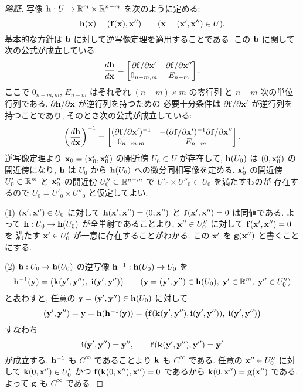 \documentclass[12pt,twoside]{jarticle}
\begin{document}
\begin{proof}[略証]
 写像 $\h:U\to \R^m\times\R^{n-m}$ を次のように定める:
 \begin{equation*}
  \h(\x) = (\f(\x),\x'')
  \qquad (\x=(\x',\x'')\in U).
 \end{equation*} 
 基本的な方針は $\h$ に対して逆写像定理を適用することである.
 この $\h$ に関して次の公式が成立している:
 \begin{equation*}
  \dfrac{d\h}{d\x} = 
  \begin{bmatrix}
   \d\f/\d\x' & \d\f/\d\x'' \\
   0_{n-m,m}  & E_{n-m} \\
  \end{bmatrix}.
 \end{equation*}
 ここで $0_{n-m,m}$, $E_{n-m}$ はそれぞれ $(n-m)\times m$ の零行列
 と $n-m$ 次の単位行列である. $\d\h/\d\x$ が逆行列を持つための
 必要十分条件は $\d\f/\d\x'$ が逆行列を持つことであり, 
 そのとき次の公式が成立している:
 \begin{equation*}
  \left(\dfrac{d\h}{d\x}\right)^{-1} = 
  \begin{bmatrix}
   (\d\f/\d\x')^{-1} & -(\d\f/\d\x')^{-1}\d\f/\d\x'' \\
   0_{n-m,m}         & E_{n-m} \\
  \end{bmatrix}.
 \end{equation*}
 逆写像定理より $\x_0=(\x'_0,\x''_0)$ の開近傍 $U_0\subset U$ が存在して, 
 $\h(U_0)$ は $(0,\x_0'')$ の開近傍になり, 
 $\h$ は $U_0$ から $\h(U_0)$ への微分同相写像を定める.
 $\x'_0$ の開近傍 $U'_0\subset\R^m$ 
 と $\x''_0$ の開近傍 $U''_0\subset\R^{n-m}$ で
 $U'_0\times U''_0\subset U_0$ を満たすものが
 存在するので $U_0=U'_0\times U''_0$ と仮定してよい.

 (1) $(\x',\x'')\in U_0$ に対して $\h(\x',\x'')=(0,\x'')$ と 
 $\f(\x',\x'')=0$ は同値である. 
 よって $\h:U_0\to\h(U_0)$ が全単射であることより, 
 $\x''\in U''_0$ に対して $\f(\x',\x'')=0$ を
 満たす $\x'\in U'_0$ が一意に存在することがわかる.
 この $\x'$ を $\g(\x'')$ と書くことにする.

 (2) $\h:U_0\to\h(U_0)$ の逆写像 $\h^{-1}:\h(U_0)\to U_0$ を
 \begin{equation*}
  \h^{-1}(\y)=\bigl(\k(\y',\y''),\;\i(\y',\y'')\bigr)
  \qquad
  (\y=(\y',\y'')\in\h(U_0),\;\y'\in\R^m,\;\y''\in U''_0)
 \end{equation*}
 と表わすと, 任意の $\y=(\y',\y'')\in\h(U_0)$ に対して
 \begin{equation*}
  (\y',\y'') = \y = \h(\h^{-1}(\y)) 
   = \bigl(\f(\k(\y',\y''),\i(\y',\y'')),\; \i(\y',\y'')\bigr)
 \end{equation*}
 すなわち
 \begin{equation*}
  \i(\y',\y'')=\y'', \qquad \f(\k(\y',\y''),\y'')=\y'
 \end{equation*}
 が成立する. $\h^{-1}$ も $C^\infty$ であることより $\k$ も $C^\infty$ 
 である. 任意の $\x''\in U''_0$ に対して %
 $\k(0,\x'')\in U'_0$ かつ $\f(\k(0,\x''),\x'')=0$ であるから %
 $\k(0,\x'')=\g(\x'')$ である. よって $\g$ も $C^\infty$ である.


\end{proof}
\end{document}
